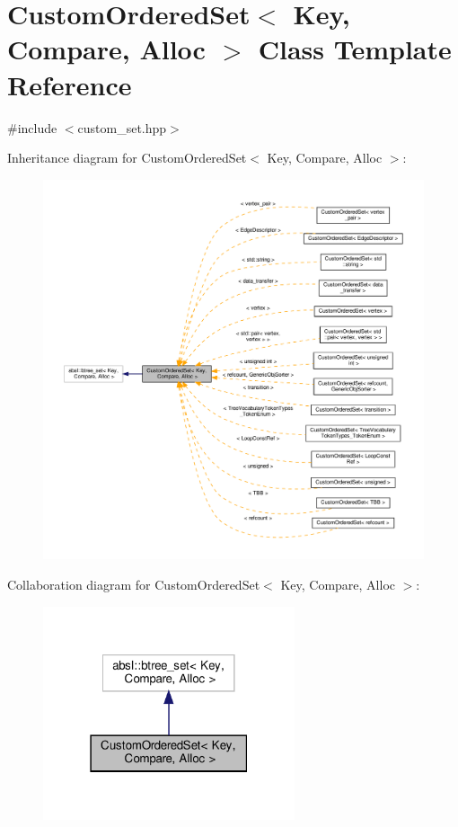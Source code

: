 \hypertarget{classCustomOrderedSet}{}\section{Custom\+Ordered\+Set$<$ Key, Compare, Alloc $>$ Class Template Reference}
\label{classCustomOrderedSet}


{\ttfamily \#include $<$custom\+\_\+set.\+hpp$>$}



Inheritance diagram for Custom\+Ordered\+Set$<$ Key, Compare, Alloc $>$\+:
\nopagebreak
\begin{figure}[H]
\begin{center}
\leavevmode
\includegraphics[width=350pt]{d7/dcc/classCustomOrderedSet__inherit__graph}
\end{center}
\end{figure}


Collaboration diagram for Custom\+Ordered\+Set$<$ Key, Compare, Alloc $>$\+:
\nopagebreak
\begin{figure}[H]
\begin{center}
\leavevmode
\includegraphics[width=210pt]{d2/da6/classCustomOrderedSet__coll__graph}
\end{center}
\end{figure}
